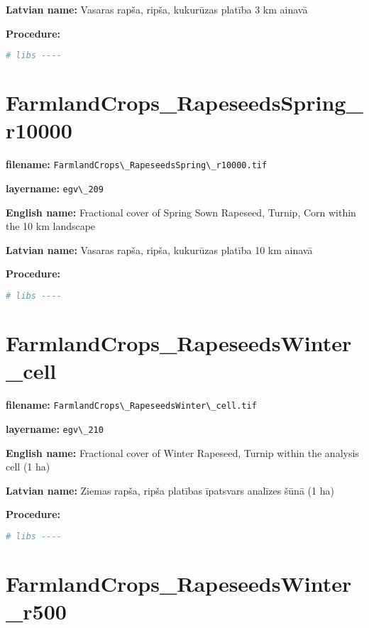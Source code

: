 \documentclass[
]{book}
\newcommand{\passthrough}[1]{#1}
\begin{document}
\textbf{Latvian name:} Vasaras rapša, ripša, kukurūzas platība 3 km ainavā

\textbf{Procedure:}

\begin{lstlisting}[language=R]
# libs ----
\end{lstlisting}

\section{FarmlandCrops\_RapeseedsSpring\_r10000}\label{ch06.209}

\textbf{filename:} \passthrough{\lstinline!FarmlandCrops\_RapeseedsSpring\_r10000.tif!}

\textbf{layername:} \passthrough{\lstinline!egv\_209!}

\textbf{English name:} Fractional cover of Spring Sown Rapeseed, Turnip, Corn within the 10 km landscape

\textbf{Latvian name:} Vasaras rapša, ripša, kukurūzas platība 10 km ainavā

\textbf{Procedure:}

\begin{lstlisting}[language=R]
# libs ----
\end{lstlisting}

\section{FarmlandCrops\_RapeseedsWinter\_cell}\label{ch06.210}

\textbf{filename:} \passthrough{\lstinline!FarmlandCrops\_RapeseedsWinter\_cell.tif!}

\textbf{layername:} \passthrough{\lstinline!egv\_210!}

\textbf{English name:} Fractional cover of Winter Rapeseed, Turnip within the analysis cell (1 ha)

\textbf{Latvian name:} Ziemas rapša, ripša platības īpatsvars analīzes šūnā (1 ha)

\textbf{Procedure:}

\begin{lstlisting}[language=R]
# libs ----
\end{lstlisting}

\section{FarmlandCrops\_RapeseedsWinter\_r500}\label{ch06.211}
\end{document}
